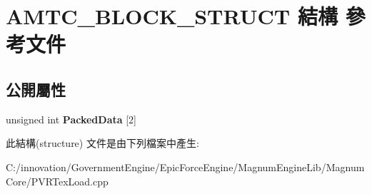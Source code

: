 \hypertarget{struct_a_m_t_c___b_l_o_c_k___s_t_r_u_c_t}{}\section{A\+M\+T\+C\+\_\+\+B\+L\+O\+C\+K\+\_\+\+S\+T\+R\+U\+CT 結構 參考文件}
\label{struct_a_m_t_c___b_l_o_c_k___s_t_r_u_c_t}
\subsection*{公開屬性}
\begin{DoxyCompactItemize}
\item 
unsigned int {\bfseries Packed\+Data} \mbox{[}2\mbox{]}\hypertarget{struct_a_m_t_c___b_l_o_c_k___s_t_r_u_c_t_a92abb2ddcfd8e4706c6c240beb5bffa5}{}\label{struct_a_m_t_c___b_l_o_c_k___s_t_r_u_c_t_a92abb2ddcfd8e4706c6c240beb5bffa5}

\end{DoxyCompactItemize}


此結構(structure) 文件是由下列檔案中產生\+:\begin{DoxyCompactItemize}
\item 
C\+:/innovation/\+Government\+Engine/\+Epic\+Force\+Engine/\+Magnum\+Engine\+Lib/\+Magnum\+Core/P\+V\+R\+Tex\+Load.\+cpp\end{DoxyCompactItemize}
